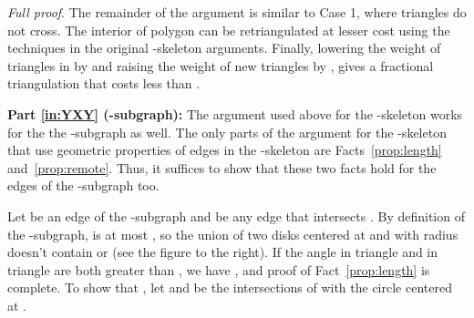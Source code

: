 \documentclass[final]{siamltex}
\newenvironment{fullproof}{\par{\it Full proof}. \ignorespaces}{\endproof}
\begin{document}
\begin{fullproof}
The remainder of the argument is similar to Case 1, where triangles do not cross.
The interior of polygon  can be retriangulated at lesser cost using the techniques
in the original -skeleton arguments. 
Finally, lowering the weight of triangles in  by 
and raising the weight of new triangles by ,
gives a fractional triangulation that costs less than .




\noindent
{\bf Part \ref{in:YXY} (-subgraph):}
 The argument used above for the -skeleton works for the the -subgraph as well.
The only parts of the argument for the -skeleton that use geometric properties of 
edges in the -skeleton are Facts~\ref{prop:length} and~\ref{prop:remote}.
Thus, it suffices to show that these two facts hold for the edges of the -subgraph too.
Let  be an edge of the -subgraph and  be any edge that intersects . 
By definition of the -subgraph,
 is at most , so
the union of two disks centered at  and  with radius  doesn't contain  
or  (see the figure to the right). 
If the angle  in triangle  and  in triangle 
are both greater than , we have ,
and proof of Fact~\ref{prop:length} is complete.
To show that , 
let  and  be the intersections of  with the circle centered at .

\end{window}
\end{fullproof}
\end{document}
